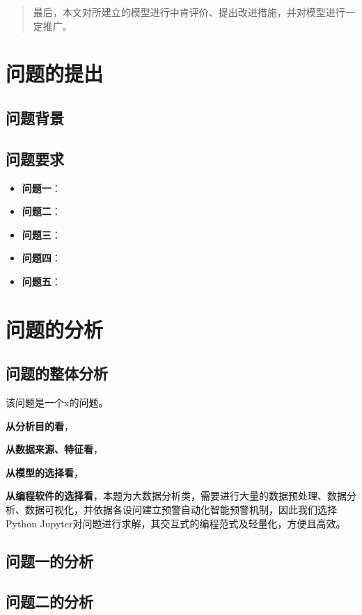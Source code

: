 \documentclass{MathModeling}
\begin{document}
	\begin{abstract}
		最后，本文对所建立的模型进行中肯评价、提出改进措施，并对模型进行一定推广。
	\end{abstract}

	\pagestyle{empty}
	\tableofcontents
	\newpage
	\pagestyle{fancy}

	\setcounter{page}{1}
	\section{问题的提出}
	\subsection{问题背景}
	
	\subsection{问题要求}
	\begin{itemize}
		\item \textbf{问题一}：
		\item \textbf{问题二}：
		\item \textbf{问题三}：
		\item \textbf{问题四}：
		\item \textbf{问题五}：
	\end{itemize}

	\section{问题的分析}
	\subsection{问题的整体分析}
	该问题是一个x的问题。
	
	\textbf{从分析目的看}，

	\textbf{从数据来源、特征看}，
	
	\textbf{从模型的选择看}，

	\textbf{从编程软件的选择看}，本题为大数据分析类，需要进行大量的数据预处理、数据分析、数据可视化，并依据各设问建立预警自动化智能预警机制，因此我们选择Python Jupyter对问题进行求解，其交互式的编程范式及轻量化，方便且高效。
	
	\subsection{问题一的分析}
	
	\subsection{问题二的分析}
	
\end{document}
